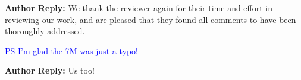 \documentclass[11pt,a4paper]{letter} %
\begin{document}
\textbf{Author Reply:} We thank the reviewer again for their time and effort in reviewing our work, and are pleased that they found all comments to have been thoroughly addressed.

\textcolor{blue}{
PS I'm glad the 7M was just a typo!
}

\textbf{Author Reply:} Us too!




\clearpage
\newpage



\end{document}
